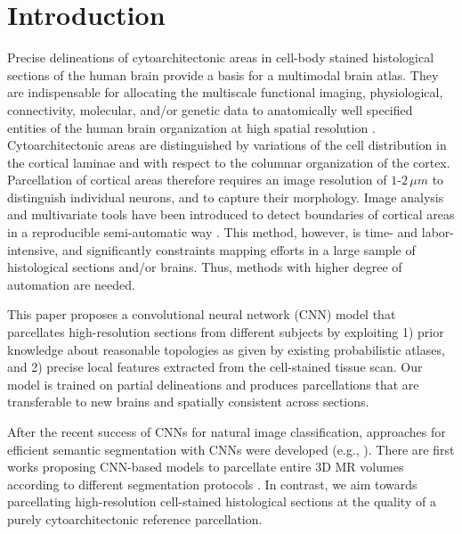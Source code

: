 \documentclass{article}
\begin{document}
\section{Introduction}
\label{sec:intro}
%
Precise delineations of cytoarchitectonic areas in cell-body stained histological sections of the human brain provide a basis for a multimodal brain atlas.
They are indispensable for allocating the multiscale functional imaging, physiological, connectivity, molecular, and/or genetic data to anatomically well specified entities of the human brain organization at high spatial resolution \cite{amunts2015}. 
Cytoarchitectonic areas are distinguished by variations of the cell distribution in the cortical laminae and with respect to the columnar organization of the cortex. 
Parcellation of cortical areas therefore requires an image resolution of $1$-$2\,\mu m$ to distinguish individual neurons, and to capture their morphology. 
Image analysis and multivariate tools have been introduced to detect boundaries of cortical areas in a reproducible semi-automatic way \cite{schleicher1999}.
This method, however, is time- and labor-intensive, and significantly constraints mapping efforts in a large sample of histological sections and/or brains. 
Thus, methods with higher degree of automation are needed.  

This paper proposes a convolutional neural network (CNN) model that parcellates high-resolution sections from different subjects by exploiting 1) prior knowledge about reasonable topologies as given by existing probabilistic atlases, and 2) precise local features extracted from the cell-stained tissue scan.
Our model is trained on partial delineations and produces parcellations that are transferable to new brains and spatially consistent across sections. 


After the recent success of CNNs for natural image classification, approaches for efficient semantic segmentation with CNNs were developed (e.g., \cite{ronneberger2015}). 
There are first works proposing CNN-based models to parcellate entire 3D MR volumes according to different segmentation protocols \cite{brebisson2015, lee2011}. 
In contrast, we aim towards parcellating high-resolution cell-stained histological sections at the quality of a purely cytoarchitectonic reference parcellation.
\end{document}
